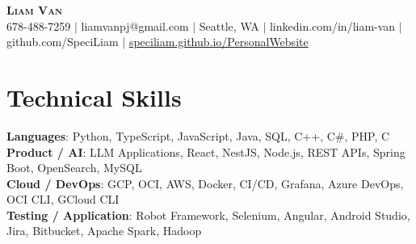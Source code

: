\documentclass[letterpaper,11pt]{article}
\begin{document}

%
\begin{center}
    \textbf{\Huge \scshape Liam Van} \\ \vspace{1pt}
    \small 678-488-7259 $|$ \small {liamvanpj@gmail.com} $|$ Seattle, WA
 {{$|$ linkedin.com/in/liam-van} {$|$ github.com/SpeciLiam} {$|$ \href{https://speciliam.github.io/PersonalWebsite}{speciliam.github.io/PersonalWebsite}}}

\end{center}

\section{Technical Skills}
 \begin{itemize}[leftmargin=0.15in, label={}]
    \small{\item{
     \textbf{Languages}{: Python, TypeScript, JavaScript, Java, SQL, C++, C\#, PHP, C} \\
     \textbf{Product / AI}{: LLM Applications, React, NestJS, Node.js, REST APIs, Spring Boot, OpenSearch, MySQL} \\
     \textbf{Cloud / DevOps}{: GCP, OCI, AWS, Docker, CI/CD, Grafana, Azure DevOps, OCI CLI, GCloud CLI} \\
     \textbf{Testing / Application}{: Robot Framework, Selenium, Angular, Android Studio, Jira, Bitbucket, Apache Spark, Hadoop} \\
    }}
 \end{itemize}
%
\end{document}
